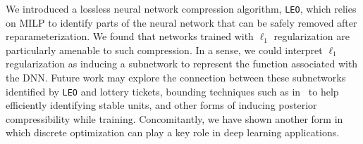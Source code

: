 \documentclass[runningheads]{llncs}
\begin{document}
We introduced a lossless neural network compression algorithm, \texttt{LEO}, which relies on MILP to identify parts of the neural network that can be safely removed after reparameterization. 
We found that networks trained with $\ell_1$ regularization are particularly amenable to such compression. In a sense, we could interpret $\ell_1$ regularization as inducing a subnetwork to represent the function associated with the DNN. 
Future work may explore the connection between these subnetworks identified by \texttt{LEO} and lottery tickets, 
bounding techniques such as in~\cite{WongKolter} to help efficiently identifying stable units, and 
other forms of inducing posterior compressibility while training.
Concomitantly, we have shown another form in which discrete optimization can play a key role in deep learning applications. 






\end{document}
